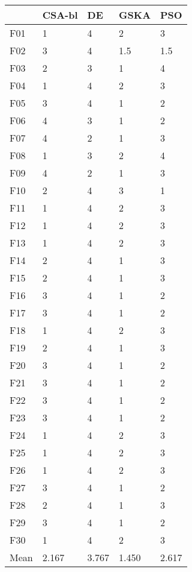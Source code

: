 \begin{tabular}{lllll}
\toprule
{} & CSA-bl &     DE &   GSKA &    PSO \\
\midrule
F01  &      1 &      4 &      2 &      3 \\
F02  &      3 &      4 &    1.5 &    1.5 \\
F03  &      2 &      3 &      1 &      4 \\
F04  &      1 &      4 &      2 &      3 \\
F05  &      3 &      4 &      1 &      2 \\
F06  &      4 &      3 &      1 &      2 \\
F07  &      4 &      2 &      1 &      3 \\
F08  &      1 &      3 &      2 &      4 \\
F09  &      4 &      2 &      1 &      3 \\
F10  &      2 &      4 &      3 &      1 \\
F11  &      1 &      4 &      2 &      3 \\
F12  &      1 &      4 &      2 &      3 \\
F13  &      1 &      4 &      2 &      3 \\
F14  &      2 &      4 &      1 &      3 \\
F15  &      2 &      4 &      1 &      3 \\
F16  &      3 &      4 &      1 &      2 \\
F17  &      3 &      4 &      1 &      2 \\
F18  &      1 &      4 &      2 &      3 \\
F19  &      2 &      4 &      1 &      3 \\
F20  &      3 &      4 &      1 &      2 \\
F21  &      3 &      4 &      1 &      2 \\
F22  &      3 &      4 &      1 &      2 \\
F23  &      3 &      4 &      1 &      2 \\
F24  &      1 &      4 &      2 &      3 \\
F25  &      1 &      4 &      2 &      3 \\
F26  &      1 &      4 &      2 &      3 \\
F27  &      3 &      4 &      1 &      2 \\
F28  &      2 &      4 &      1 &      3 \\
F29  &      3 &      4 &      1 &      2 \\
F30  &      1 &      4 &      2 &      3 \\
Mean &  2.167 &  3.767 &  1.450 &  2.617 \\
\bottomrule
\end{tabular}
